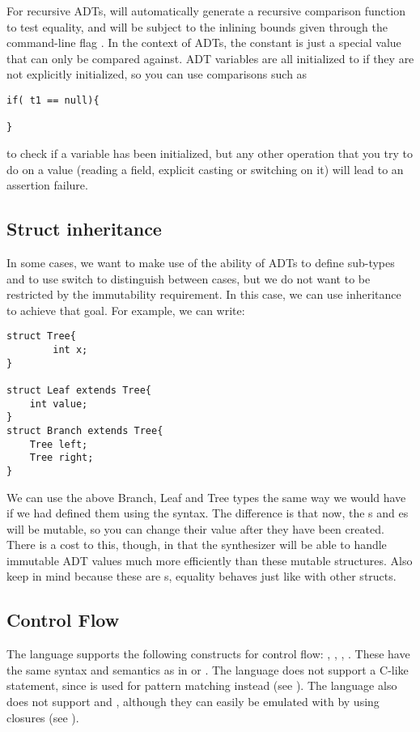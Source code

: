 For recursive ADTs, \Sk{} will automatically generate a recursive comparison function to test equality, and will be subject to the inlining bounds given through the command-line flag .
In the context of ADTs, the constant  is just a special value that can only be compared against. ADT variables are all initialized to  if they are not explicitly initialized, so you can use comparisons such as
\begin{lstlisting}
if( t1 == null){

}
\end{lstlisting}
to check if a variable has been initialized, but any other operation that you try to do on a  value (reading a field, explicit casting or switching on it) will lead to an assertion failure.

\subsection{Struct inheritance}
In some cases, we want to make use of the ability of ADTs to define sub-types and to use switch to distinguish between cases, but we do not want to be restricted by the immutability requirement. In this case, we can use  inheritance to achieve that goal. For example, we can write:
\begin{lstlisting}
struct Tree{
        int x;
}

struct Leaf extends Tree{
    int value;
}
struct Branch extends Tree{
    Tree left;
    Tree right;
}
\end{lstlisting}

We can use the above Branch, Leaf and Tree types the same way we would have if we had defined them using the  syntax. The difference is that now, the s and es will be mutable, so you can change their value after they have been created. There is a cost to this, though, in that the synthesizer will be able to handle immutable ADT values much more efficiently than these mutable structures. Also keep in mind because these are s, equality behaves just like with other structs.



\subsection{Control Flow}
The language supports the following constructs for control flow: , , , . These have the same syntax and semantics as in  or . The language does not support a C-like  statement, since  is used for pattern matching instead (see ). The language also does not support  and , although they can easily be emulated with  by using closures (see ).

